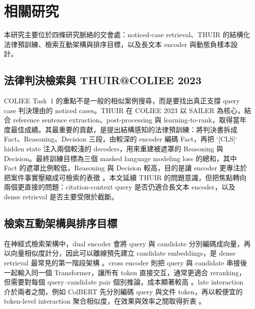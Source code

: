 \section{相關研究}

本研究主要位於四條研究脈絡的交會處：noticed-case retrieval、THUIR 的結構化法律預訓練、檢索互動架構與排序目標，以及長文本 encoder 與動態負樣本設計。

\subsection{法律判決檢索與 THUIR@COLIEE 2023}

COLIEE Task~1 的重點不是一般的相似案例搜尋，而是要找出真正支撐 query case 判決理由的 noticed cases。THUIR 在 COLIEE 2023 \cite{li2023thuir} 以 SAILER 為核心，結合 reference sentence extraction、post-processing 與 learning-to-rank，取得當年度最佳成績。其最重要的貢獻，是提出結構感知的法律預訓練：將判決書拆成 Fact、Reasoning、Decision 三段，由較深的 encoder 編碼 Fact，再把 `[CLS]` hidden state 注入兩個較淺的 decoders，用來重建被遮罩的 Reasoning 與 Decision。最終訓練目標為三個 masked language modeling loss 的總和，其中 Fact 的遮罩比例較低，Reasoning 與 Decision 較高，目的是讓 encoder 更專注於把案件事實壓縮成可檢索的表徵 \cite{li2023thuir}。本文延續 THUIR 的問題意識，但把焦點轉向兩個更直接的問題：citation-context query 是否仍適合長文本 encoder，以及 dense retrieval 是否主要受限於截斷。

\subsection{檢索互動架構與排序目標}

在神經式檢索架構中，dual encoder 會將 query 與 candidate 分別編碼成向量，再以向量相似度計分，因此可以離線預先建立 candidate embeddings，是 dense retrieval 最常見的第一階段架構 \cite{karpukhin2020dpr}。cross encoder 則把 query 與 candidate 串接後一起輸入同一個 Transformer，讓所有 token 直接交互，通常更適合 reranking，但需要對每個 query--candidate pair 個別推論，成本顯著較高 \cite{nogueira2019bertpr}。late interaction 介於兩者之間，例如 ColBERT 先分別編碼 query 與文件 token，再以較便宜的 token-level interaction 聚合相似度，在效果與效率之間取得折衷 \cite{khattab2020colbert}。

